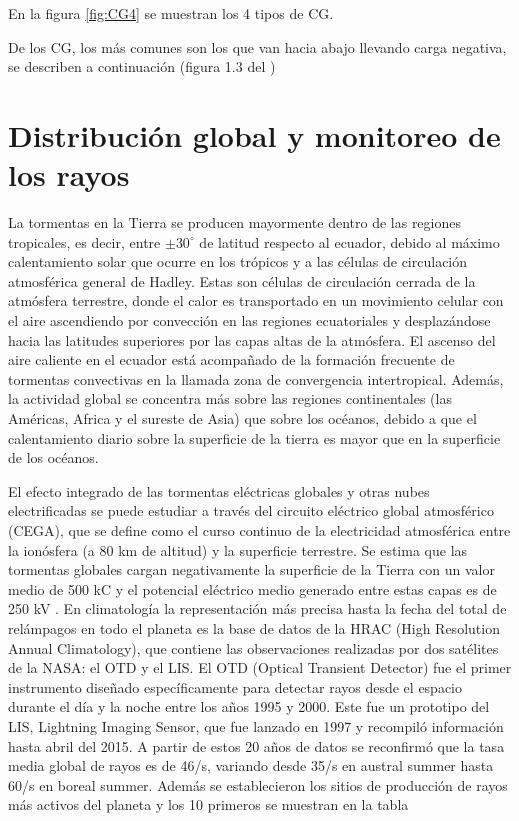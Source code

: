 \documentclass[12pt,oneside,openany,letter]{book}
\begin{document}
En la figura \ref{fig:CG4} se muestran los 4 tipos de CG.  


De los CG, los más comunes son los que van hacia abajo llevando carga negativa, se describen a continuación (figura 1.3 del \cite{DwyerUman2014})

\section{Distribución global y monitoreo de los rayos}


La tormentas en la Tierra se producen mayormente dentro de las regiones tropicales, es decir, entre $\pm 30^{\circ}$ de latitud respecto al ecuador, debido al máximo calentamiento solar que ocurre en los trópicos y a las células de circulación atmosférica general de Hadley. Estas son células de circulación cerrada de la atmósfera terrestre, donde el calor es transportado en un movimiento celular con el aire ascendiendo por convección en las regiones ecuatoriales y desplazándose hacia las latitudes superiores por las capas altas de la atmósfera. El ascenso del aire caliente en el ecuador está acompañado de la formación frecuente de tormentas convectivas en la llamada zona de convergencia intertropical. Además, la actividad global se concentra más sobre las regiones continentales (las Américas, Africa y el sureste de Asia) que sobre los océanos, debido a que el calentamiento diario sobre la superficie de la tierra es mayor que en la superficie de los océanos. 

El efecto integrado de las tormentas eléctricas globales y otras nubes electrificadas se puede estudiar a través del circuito eléctrico global atmosférico (CEGA), que se define como el curso continuo de la electricidad atmosférica entre la ionósfera (a 80 km de altitud) y la superficie terrestre. Se estima que las tormentas globales cargan negativamente la superficie de la Tierra con un valor medio de 500 kC y el potencial eléctrico medio generado entre estas capas es de 250 kV \cite{FullekrugEtal2006}. En climatología la representación más precisa hasta la fecha del total de relámpagos en todo el planeta es la base de datos de la HRAC (High Resolution Annual Climatology), que contiene las observaciones realizadas por dos satélites de la NASA: el OTD y el LIS. El OTD (Optical Transient Detector) fue el primer instrumento diseñado específicamente para detectar rayos desde el espacio durante el día y la noche entre los años 1995 y 2000. Este fue un prototipo del LIS, Lightning Imaging Sensor, que fue lanzado en 1997 y recompiló información hasta abril del 2015. A partir de estos 20 años de datos se reconfirmó que la tasa media global de rayos es de 46/s, variando desde 35/s en austral summer hasta 60/s en boreal summer. Además se establecieron los sitios de producción de rayos más activos del planeta y los 10 primeros se muestran en la tabla 
\end{document}
